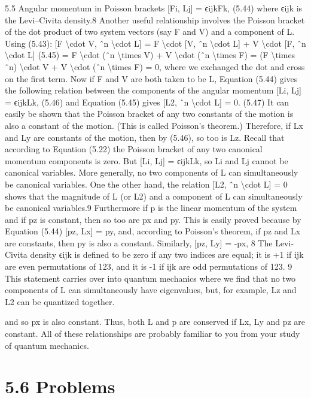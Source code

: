5.5
Angular momentum in Poisson brackets
[Fi, Lj] = ϵijkFk,
(5.44)
where ϵijk is the Levi--Civita density.8
Another useful relationship involves the Poisson bracket of the dot product
of two system vectors (say F and V) and a component of L. Using (5.43):
[F \textbackslash{}cdot  V, ˆn \textbackslash{}cdot  L] = F \textbackslash{}cdot  [V, ˆn \textbackslash{}cdot  L] + V \textbackslash{}cdot  [F, ˆn \textbackslash{}cdot  L]
(5.45)
= F \textbackslash{}cdot  (ˆn \textbackslash{}times  V) + V \textbackslash{}cdot  (ˆn \textbackslash{}times  F)
= (F \textbackslash{}times  ˆn) \textbackslash{}cdot  V + V \textbackslash{}cdot  (ˆn \textbackslash{}times  F) = 0,
where we exchanged the dot and cross on the first term. Now if F and V are
both taken to be L, Equation (5.44) gives the following relation between the
components of the angular momentum
[Li, Lj] = ϵijkLk,
(5.46)
and Equation (5.45) gives
[L2, ˆn \textbackslash{}cdot  L] = 0.
(5.47)
It can easily be shown that the Poisson bracket of any two constants of the
motion is also a constant of the motion. (This is called Poisson's theorem.)
Therefore, if Lx and Ly are constants of the motion, then by (5.46), so too is
Lz. Recall that according to Equation (5.22) the Poisson bracket of any two
canonical momentum components is zero. But [Li, Lj] = ϵijkLk, so Li and
Lj cannot be canonical variables. More generally, no two components of L
can simultaneously be canonical variables. One the other hand, the relation
[L2, ˆn \textbackslash{}cdot  L] = 0 shows that the magnitude of L (or L2) and a component of L
can simultaneously be canonical variables.9
Furthermore if p is the linear momentum of the system and if pz is constant,
then so too are px and py. This is easily proved because by Equation (5.44)
[pz, Lx] = py,
and, according to Poisson's theorem, if pz and Lx are constants, then py is also
a constant. Similarly,
[pz, Ly] = -px,
8 The Levi-Civita density ϵijk is defined to be zero if any two indices are equal; it is +1 if ijk
are even permutations of 123, and it is -1 if ijk are odd permutations of 123.
9 This statement carries over into quantum mechanics where we find that no two components of
L can simultaneously have eigenvalues, but, for example, Lz and L2 can be quantized
together.

and so px is also constant. Thus, both L and p are conserved if Lx, Ly and pz
are constant.
All of these relationships are probably familiar to you from your study of
quantum mechanics.
\section*{5.6  Problems}

